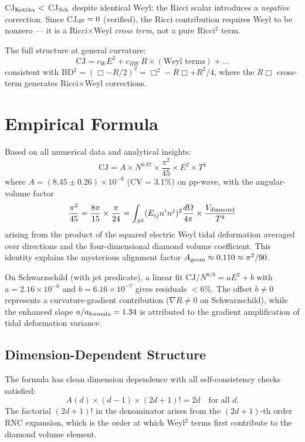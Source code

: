 \documentclass[11pt,a4paper]{article}
\begin{document}
CJ$_{\rm Kottler} < $ CJ$_{\rm Sch}$ despite identical Weyl: the Ricci scalar introduces a \emph{negative} correction. Since CJ$_{\rm dS} = 0$ (verified), the Ricci contribution requires Weyl to be nonzero --- it is a Ricci$\times$Weyl \emph{cross term}, not a pure Ricci$^2$ term.

The full structure at general curvature:
\begin{equation}
\text{CJ} = c_W E^2 + c_{RW}\, R \times (\text{Weyl terms}) + \ldots
\end{equation}
consistent with BD$^2 = (\Box - R/2)^2 = \Box^2 - R\Box + R^2/4$, where the $R\Box$ cross-term generates Ricci$\times$Weyl corrections.

\section{Empirical Formula}

Based on all numerical data and analytical insights:
\begin{equation}
\text{CJ} = A \times N^{0.87} \times \frac{\pi^2}{45} \times E^2 \times T^4
\end{equation}
where $A = (8.45 \pm 0.26) \times 10^{-6}$ (CV = 3.1\%) on pp-wave, with the angular-volume factor
\begin{equation}
\frac{\pi^2}{45} = \frac{8\pi}{15} \times \frac{\pi}{24} = \int_{S^2} (E_{ij}n^i n^j)^2 \frac{d\Omega}{4\pi} \times \frac{V_{\rm diamond}}{T^4}
\end{equation}
arising from the product of the squared electric Weyl tidal deformation averaged over directions and the four-dimensional diamond volume coefficient. This identity explains the mysterious alignment factor $A_{\rm geom} \approx 0.110 \approx \pi^2/90$.

On Schwarzschild (with jet predicate), a linear fit $\text{CJ}/N^{8/9} = a E^2 + b$ with $a = 2.16 \times 10^{-6}$ and $b = 6.16 \times 10^{-7}$ gives residuals $<6\%$. The offset $b \neq 0$ represents a curvature-gradient contribution ($\nabla R \neq 0$ on Schwarzschild), while the enhanced slope $a/a_{\rm formula} = 1.34$ is attributed to the gradient amplification of tidal deformation variance.

\subsection{Dimension-Dependent Structure}

The formula has clean dimension dependence with all self-consistency checks satisfied:
\begin{equation}
A(d) \times (d-1) \times (2d+1)! = 2d \quad \text{for all } d.
\end{equation}
The factorial $(2d+1)!$ in the denominator arises from the $(2d+1)$-th order RNC expansion, which is the order at which Weyl$^2$ terms first contribute to the diamond volume element.
\end{document}
